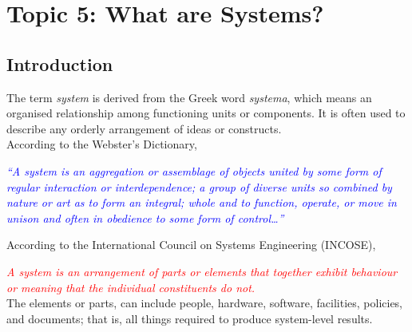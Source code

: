 \documentclass[../notes-main.tex]{subfiles}
\begin{document}
\section{Topic 5: What are Systems?}
\subsection{Introduction}
The term \emph{system} is derived from the Greek word \emph{systema}, which means an organised relationship among functioning units or components. It is often used to describe any orderly arrangement of ideas or constructs.\\
According to the Webster's Dictionary,
\begin{mdframed}
    \begin{center}
        \textcolor{blue}{%
            \emph{``A system is an aggregation or assemblage of objects united by some form of regular interaction or interdependence; a group of diverse units so combined by nature or art as to form an integral; whole and to function, operate, or move in unison and often in obedience to some form of control\dots''}}
    \end{center}
\end{mdframed}\label{fig:system-def-webster}
\noindent According to the International Council on Systems Engineering (INCOSE),
\begin{mdframed}
    \begin{center}
        \textcolor{red}{%
            \emph{A system is an arrangement of parts or elements that together exhibit behaviour or meaning that the individual constituents do not.}}\\ The elements or parts, can include people, hardware, software, facilities, policies, and documents; that is, all things required to produce system-level results.
    \end{center}
\end{mdframed}\label{fig:system-def-incose}
\end{document}
